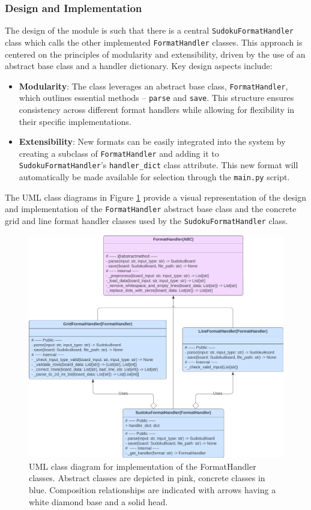 \documentclass[11pt]{article}
\begin{document}
\subsubsection{Design and Implementation}
The design of the module is such that there is a central \texttt{SudokuFormatHandler} class which calls the other implemented \texttt{FormatHandler} classes. This approach is centered on the principles of modularity and extensibility, driven by the use of an abstract base class and a handler dictionary. Key design aspects include:

\begin{itemize}
    \item \textbf{Modularity}: The class leverages an abstract base class, \texttt{FormatHandler}, which outlines essential methods -- \texttt{parse} and \texttt{save}. This structure ensures consistency across different format handlers while allowing for flexibility in their specific implementations.
    \item \textbf{Extensibility}: New formats can be easily integrated into the system by creating a subclass of \texttt{FormatHandler} and adding it to \texttt{SudokuFormatHandler}'s \texttt{handler\_dict} class attribute. This new format will automatically be made available for selection through the \texttt{main.py} script. 
\end{itemize}
The UML class diagrams in Figure \ref{fig:format_handler_uml} provide a visual representation of the design and implementation of the \texttt{FormatHandler} abstract base class and the concrete grid and line format handler classes used by the \texttt{SudokuFormatHandler} class.

\begin{figure}[H]
    \centering
    \includegraphics[width=1\textwidth]{figs/UML_sudoku_handlers.png}
    \caption{UML class diagram for implementation of the FormatHandler classes. Abstract classes are depicted in pink, concrete classes in blue. Composition relationships are indicated with arrows having a white diamond base and a solid head.}
    \label{fig:format_handler_uml}
\end{figure}
\end{document}
